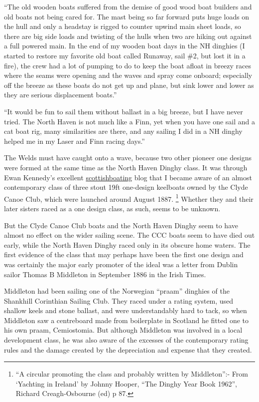 \documentclass[
  letterpaper,
]{scrbook}
\begin{document}
``The old wooden boats suffered from the demise of good wood boat
builders and old boats not being cared for. The mast being so far
forward puts huge loads on the hull and only a headstay is rigged to
counter upwind main sheet loads, so there are big side loads and
twisting of the hulls when two are hiking out against a full powered
main. In the end of my wooden boat days in the NH dinghies (I started to
restore my favorite old boat called Runaway, sail \#2, but lost it in a
fire), the crew had a lot of pumping to do to keep the boat afloat in
breezy races where the seams were opening and the waves and spray come
onboard; especially off the breeze as these boats do not get up and
plane, but sink lower and lower as they are serious displacement
boats.''

``It would be fun to sail them without ballast in a big breeze, but I
have never tried. The North Haven is not much like a Finn, yet when you
have one sail and a cat boat rig, many similarities are there, and any
sailing I did in a NH dinghy helped me in my Laser and Finn racing
days.''

The Welds must have caught onto a wave, because two other pioneer one
designs were formed at the same time as the North Haven Dinghy class. It
was through Ewan Kennedy's excellent
\href{http://scottishboating.blogspot.com.au/}{scottishboating} blog
that I became aware of an almost contemporary class of three stout 19ft
one-design keelboats owned by the Clyde Canoe Club, which were launched
around August 1887. \footnote{``A circular promoting the class and
  probably written by Middleton'':- From `Yachting in Ireland' by Johnny
  Hooper, ``The Dinghy Year Book 1962'', Richard Creagh-Osbourne (ed) p
  87.} Whether they and their later sisters raced as a one design class,
as such, seems to be unknown.

But the Clyde Canoe Club boats and the North Haven Dinghy seem to have
almost no effect on the wider sailing scene. The CCC boats seem to have
died out early, while the North Haven Dinghy raced only in its obscure
home waters. The first evidence of the class that may perhaps have been
the first one design and was certainly the major early promoter of the
ideal was a letter from Dublin sailor Thomas B Middleton in September
1886 in the Irish Times.

Middleton had been sailing one of the Norwegian ``praam'' dinghies of
the Shankhill Corinthian Sailing Club. They raced under a rating system,
used shallow keels and stone ballast, and were understandably hard to
tack, so when Middleton saw a centreboard made from boilerplate in
Scotland he fitted one to his own praam, Cemiostomia. But although
Middleton was involved in a local development class, he was also aware
of the excesses of the contemporary rating rules and the damage created
by the depreciation and expense that they created.
\end{document}
